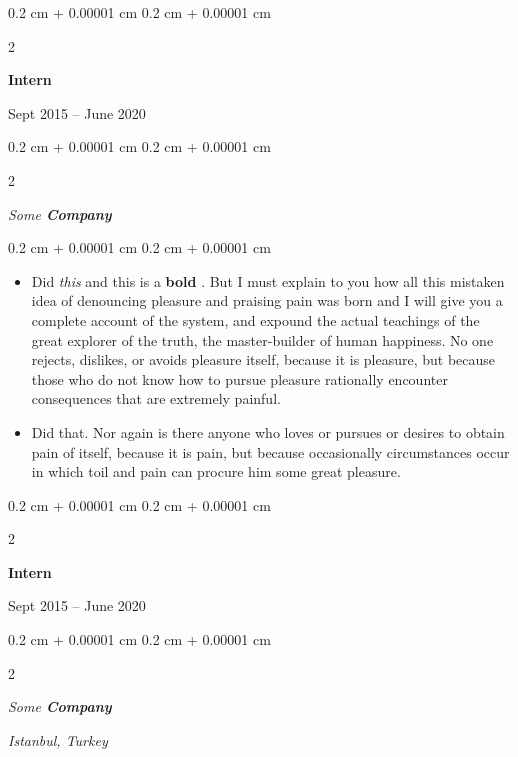 \documentclass[10pt, letterpaper]{article}
\newenvironment{highlights}{
    \begin{itemize}[
        topsep=0.10 cm,
        parsep=0.10 cm,
        partopsep=0pt,
        itemsep=0pt,
        leftmargin=0.4 cm + 10pt
    ]
}{
    \end{itemize}
} %
\newenvironment{onecolentry}{
    \begin{adjustwidth}{
        0.2 cm + 0.00001 cm
    }{
        0.2 cm + 0.00001 cm
    }
}{
    \end{adjustwidth}
} %
\newenvironment{twocolentry}[2][]{
    \onecolentry
    \def\secondColumn{#2}
    \setcolumnwidth{\fill, 4.5 cm}
    \begin{paracol}{2}
}{
    \switchcolumn \raggedleft \secondColumn
    \end{paracol}
    \endonecolentry
} %
\let\hrefWithoutArrow\href
\renewcommand{\href}[2]{\hrefWithoutArrow{#1}{\ifthenelse{\equal{#2}{}}{ }{#2 }\raisebox{.15ex}{\footnotesize \faExternalLink*}}}
\begin{document}
        \vspace{0.2 cm}

                \begin{twocolentry}{
                    Sept 2015 – June 2020
                }
                \textbf{Intern}
                \end{twocolentry}
            \begin{twocolentry}{
            }
            \textit{Some \textbf{Company}}
            \end{twocolentry}

        \vspace{0.10 cm}
        \begin{onecolentry}
            \begin{highlights}
                \item Did \textit{this} and this is a \textbf{bold} \href{https://example.com}{link}. But I must explain to you how all this mistaken idea of denouncing pleasure and praising pain was born and I will give you a complete account of the system, and expound the actual teachings of the great explorer of the truth, the master-builder of human happiness. No one rejects, dislikes, or avoids pleasure itself, because it is pleasure, but because those who do not know how to pursue pleasure rationally encounter consequences that are extremely painful.
                \item Did that. Nor again is there anyone who loves or pursues or desires to obtain pain of itself, because it is pain, but because occasionally circumstances occur in which toil and pain can procure him some great pleasure.
            \end{highlights}
        \end{onecolentry}


        \vspace{0.2 cm}

                \begin{twocolentry}{
                    Sept 2015 – June 2020
                }
                \textbf{Intern}
                \end{twocolentry}
            \begin{twocolentry}{
        \textit{Istanbul, Turkey}    }
            \textit{Some \textbf{Company}}
            \end{twocolentry}
\end{document}

